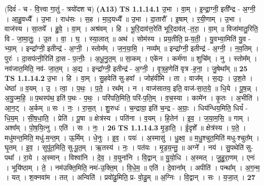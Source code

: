 \documentclass[17pt]{extarticle}
\begin{document}
                  \newline
                      (दिवं॑ - च - वि॒त्त्वा गा॒तुं - त्रयो॑दश च)  \textbf{(A13)} \newline \newline
                                \textbf{ TS 1.1.14.1} \newline
                  उ॒भा । वा॒म् । इ॒न्द्रा॒ग्नी॒ इती᳚न्द्र - अ॒ग्नी॒ । आ॒हु॒वध्यै᳚ । उ॒भा । राध॑सः । स॒ह । मा॒द॒यध्यै᳚ ॥ उ॒भा । दा॒तारौ᳚ । इ॒षाम् । र॒यी॒णाम् । उ॒भा । वाज॑स्य । सा॒तये᳚ । हु॒वे॒ । वा॒म् । अश्र॑वम् । हि । भू॒रि॒दाव॑त्त॒रेति॑ भूरि॒दाव॑त् -त॒रा॒ । वा॒म् ॥ विजा॑मातु॒रिति॒ वि - जा॒मा॒तुः॒ । उ॒त । वा॒ । घ॒ । स्या॒लात् ॥ अथ॑ । सोम॑स्य । प्रय॒तीति॒ प्र-य॒ती॒ । यु॒वभ्या॒मिति॑ यु॒व - भ्या॒म् । इन्द्रा᳚ग्नी॒ इतीन्द्र॑ - अ॒ग्नी॒ । स्तोम᳚म् । ज॒न॒या॒मि॒ । नव्य᳚म् ॥ इन्द्रा᳚ग्नी॒ इतीन्द्र॑ - अ॒ग्नी॒ । न॒व॒तिम् । पुरः॑ । दा॒सप॑त्नी॒रिति॑ दा॒स - प॒त्नीः॒ । अ॒धू॒नु॒त॒म् ॥ सा॒कम् । एके॑न । कर्म॑णा ॥ शुचि᳚म् । नु । स्तोम᳚म् । नव॑जात॒मिति॒ नव॑- जा॒त॒म् । अ॒द्य । इन्द्रा᳚ग्नी॒ इतीन्द्र॑ - अ॒ग्नी॒ । वृ॒त्र॒ह॒णेति॑ वृत्र -ह॒ना॒ । जु॒षेथा᳚म् ॥ \textbf{  25} \newline
                  \newline
                                \textbf{ TS 1.1.14.2} \newline
                  उ॒भा । हि । वा॒म् । सु॒हवेति॑ सु-हवा᳚ । जोह॑वीमि । ता । वाज᳚म् । स॒द्यः । उ॒श॒ते । धेष्ठा᳚ ॥ व॒यम् । उ॒ । त्वा॒ । प॒थः॒ । प॒ते॒ । रथ᳚म् । न । वाज॑सातय॒ इति॒ वाज॑-सा॒त॒ये॒ ॥ धि॒ये । पू॒ष॒न्न् । अ॒यु॒ज्म॒हि॒ ॥ प॒थस्प॑थ॒ इति॑ प॒थः - प॒थः॒ । परि॑पति॒मिति॒ परि॑-प॒ति॒म् । व॒च॒स्या । कामे॑न । कृ॒तः । अ॒भीति॑ । आ॒न॒ट् । अ॒र्कम् ॥ सः । नः॒ । रा॒स॒त् । शु॒रुधः॑ । च॒न्द्राग्रा॒ इति॑ च॒न्द्र - अ॒ग्राः॒ । धिय॑न्धिय॒मिति॒ धियं᳚ - धि॒य॒म् । सी॒ष॒धा॒ति॒ । प्रेति॑ । पू॒षा ॥ क्षेत्र॑स्य । पति॑ना । व॒यम् । हि॒तेन॑ । इ॒व॒ । ज॒या॒म॒सि॒ ॥ गाम् । अश्व᳚म् । पो॒ष॒यि॒त्नु । एति॑ । सः । नः॒ । \textbf{  26} \newline
                  \newline
                                \textbf{ TS 1.1.14.3} \newline
                  मृ॒डा॒ति॒ । ई॒दृशे᳚ ॥ क्षेत्र॑स्य । प॒ते॒ । मधु॑मन्त॒मिति॒ मधु॑-म॒न्त॒म् । ऊ॒र्मिम् । धे॒नुः । इ॒व॒ । पयः॑ । अ॒स्मासु॑ । धु॒क्ष्व॒ ॥ म॒धु॒श्चुत॒मिति॑ मधु-श्चुत᳚म् । घृ॒तम् । इ॒व॒ । सुपू॑त॒मिति॒ सु-पू॒त॒म् । ऋ॒तस्य॑ । नः॒ । पत॑यः । मृ॒ड॒य॒न्तु॒ ॥ अग्ने᳚ । नय॑ । सु॒पथेति॑ सु-पथा᳚ । रा॒ये । अ॒स्मान् । विश्वा॑नि । दे॒व॒ । व॒युना॑नि । वि॒द्वान् ॥ यु॒यो॒धि । अ॒स्मत् । जु॒हु॒रा॒णम् । एनः॑ । भूयि॑ष्ठाम् । ते॒ । नम॑उक्ति॒मिति॒ नमः॑-उ॒क्ति॒म् । वि॒धे॒म॒ ॥ एति॑ । दे॒वाना᳚म् । अपीति॑ । पन्था᳚म् । अ॒ग॒न्म॒ । यत् । श॒क्नवा॑म । तत् । अन्विति॑ । प्रवो॑ढु॒मिति॒ प्र- वो॒ढु॒म् ॥ अ॒ग्निः । वि॒द्वान् । सः । य॒जा॒त् । \textbf{  27} \newline
\end{document}
